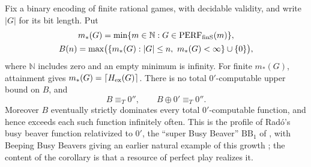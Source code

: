 \begin{corollary}\label{cor:entropybeaver}
Fix a binary encoding of finite rational games, with decidable validity,
and write $|G|$ for its bit length. Put
\[
 \begin{gathered}
 m_*(G)=\min\{m\in\mathbb N:G\in\mathrm{PERF}_{\mathrm{finS}}(m)\},\\
 B(n)=\max\bigl(\{m_*(G):|G|\le n,\ m_*(G)<\infty\}\cup\{0\}\bigr),
 \end{gathered}
\]
where $\mathbb N$ includes zero and an empty minimum is infinity.
For finite $m_*(G)$, attainment gives $m_*(G)=\lceil H_{\rm ex}(G)\rceil$.
There is no total $0'$-computable upper bound on $B$, and
\[
 B\equiv_T0'',\qquad B\oplus0'\equiv_T0''.
\]
Moreover $B$ eventually strictly dominates every total $0'$-computable function,
and hence exceeds each such function infinitely often. This is the profile of Rad\'o's busy beaver function \cite{Rado} relativized to $0'$, the ``super Busy Beaver'' $\mathrm{BB}_1$ of \cite[Section~3]{AaronsonBB}, with Beeping Busy Beavers giving an earlier natural example of this growth \cite[Section~5.10]{AaronsonBB}; the content of the corollary is that a resource of perfect play realizes it.
\end{corollary}
